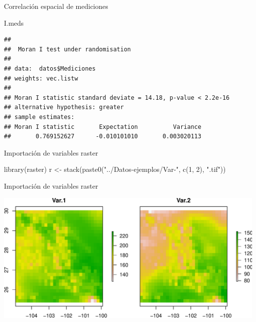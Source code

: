 \documentclass[
  11pt,
  ignorenonframetext,
]{beamer}
\newenvironment{Shaded}{}{}
\newcommand{\DecValTok}[1]{\textcolor[rgb]{0.25,0.63,0.44}{#1}}
\newcommand{\FunctionTok}[1]{\textcolor[rgb]{0.02,0.16,0.49}{#1}}
\newcommand{\NormalTok}[1]{#1}
\newcommand{\OtherTok}[1]{\textcolor[rgb]{0.00,0.44,0.13}{#1}}
\newcommand{\StringTok}[1]{\textcolor[rgb]{0.25,0.44,0.63}{#1}}
\begin{document}
\begin{frame}[fragile]{Correlación espacial de mediciones}
\protect\hypertarget{correlaciuxf3n-espacial-de-mediciones}{}
\begin{Shaded}
\begin{Highlighting}[]
\NormalTok{I.meds}
\end{Highlighting}
\end{Shaded}

\begin{verbatim}
## 
##  Moran I test under randomisation
## 
## data:  datos$Mediciones  
## weights: vec.listw    
## 
## Moran I statistic standard deviate = 14.18, p-value < 2.2e-16
## alternative hypothesis: greater
## sample estimates:
## Moran I statistic       Expectation          Variance 
##       0.769152627      -0.010101010       0.003020113
\end{verbatim}
\end{frame}

\begin{frame}[fragile]{Importación de variables raster}
\protect\hypertarget{importaciuxf3n-de-variables-raster}{}
\begin{Shaded}
\begin{Highlighting}[]
\FunctionTok{library}\NormalTok{(raster)}
\NormalTok{r }\OtherTok{\textless{}{-}} \FunctionTok{stack}\NormalTok{(}\FunctionTok{paste0}\NormalTok{(}\StringTok{"../Datos{-}ejemplos/Var{-}"}\NormalTok{, }\FunctionTok{c}\NormalTok{(}\DecValTok{1}\NormalTok{, }\DecValTok{2}\NormalTok{), }\StringTok{".tif"}\NormalTok{))}
\end{Highlighting}
\end{Shaded}
\end{frame}

\begin{frame}{Importación de variables raster}
\protect\hypertarget{importaciuxf3n-de-variables-raster-1}{}
\begin{center}\includegraphics{Usos-Moran_files/figure-beamer/unnamed-chunk-5-1} \end{center}
\end{frame}
\end{document}
